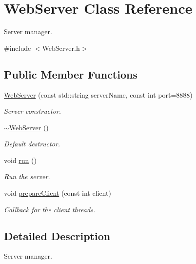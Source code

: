 \hypertarget{class_web_server}{}\section{Web\+Server Class Reference}
\label{class_web_server}


Server manager.  




{\ttfamily \#include $<$Web\+Server.\+h$>$}

\subsection*{Public Member Functions}
\begin{DoxyCompactItemize}
\item 
\hyperlink{class_web_server_a99df0a21ce0fe770473a277edd8b8945}{Web\+Server} (const std\+::string server\+Name, const int port=8888)
\begin{DoxyCompactList}\small\item\em Server constructor. \end{DoxyCompactList}\item 
\hyperlink{class_web_server_a1a0a29895986ab3558a638bc75f41259}{$\sim$\+Web\+Server} ()
\begin{DoxyCompactList}\small\item\em Default destructor. \end{DoxyCompactList}\item 
void \hyperlink{class_web_server_a0879d889c9d1071060e868b9149a20c6}{run} ()\hypertarget{class_web_server_a0879d889c9d1071060e868b9149a20c6}{}\label{class_web_server_a0879d889c9d1071060e868b9149a20c6}

\begin{DoxyCompactList}\small\item\em Run the server. \end{DoxyCompactList}\item 
void \hyperlink{class_web_server_a63ae5c9626589ec36d5b0c49842235e2}{prepare\+Client} (const int client)
\begin{DoxyCompactList}\small\item\em Callback for the client threads. \end{DoxyCompactList}\end{DoxyCompactItemize}


\subsection{Detailed Description}
Server manager. 

